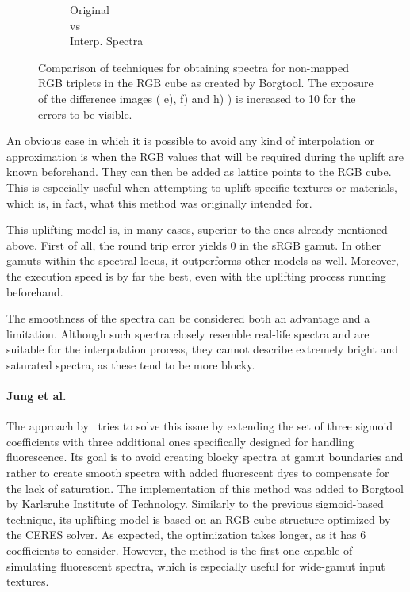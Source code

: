 \begin{figure}[t]
\begin{subfigure}[t]{0.22\textwidth}
	\caption{Original\\vs\\Interp. Spectra}
	\label{fig:sigDiffOrigSpectra}
	\end{subfigure}
	\caption{Comparison of techniques for obtaining spectra for non-mapped RGB triplets in the RGB cube as created by Borgtool. The exposure of the difference images ( e), f) and h) ) is increased to 10 for the errors to be visible.}
	\label{fig:sigmoidTexture}
\end{figure}

An obvious case in which it is possible to avoid any kind of interpolation or approximation is when the RGB values that will be required during the uplift are known beforehand. They can then be added as lattice points to the RGB cube. This is especially useful when attempting to uplift specific textures or materials, which is, in fact, what this method was originally intended for.

This uplifting model is, in many cases, superior to the ones already mentioned above. First of all, the round trip error yields 0 in the sRGB gamut. In other gamuts within the spectral locus, it outperforms other models as well. Moreover, the execution speed is by far the best, even with the uplifting process running beforehand. 

The smoothness of the spectra can be considered both an advantage and a limitation. Although such spectra closely resemble real-life spectra and are suitable for the interpolation process, they cannot describe extremely bright and saturated spectra, as these tend to be more blocky.

\paragraph{Jung et al.} The approach by~\citet{upsamplingFluorescence} tries to solve this issue by extending the set of three sigmoid coefficients with three additional ones specifically designed for handling fluorescence. Its goal is to avoid creating blocky spectra at gamut boundaries and rather to create smooth spectra with added fluorescent dyes to compensate for the lack of saturation. The implementation of this method was added to Borgtool by Karlsruhe Institute of Technology. Similarly to the previous sigmoid-based technique, its uplifting model is based on an RGB cube structure optimized by the CERES solver. As expected, the optimization takes longer, as it has 6 coefficients to consider. However, the method is the first one capable of simulating fluorescent spectra, which is especially useful for wide-gamut input textures.

